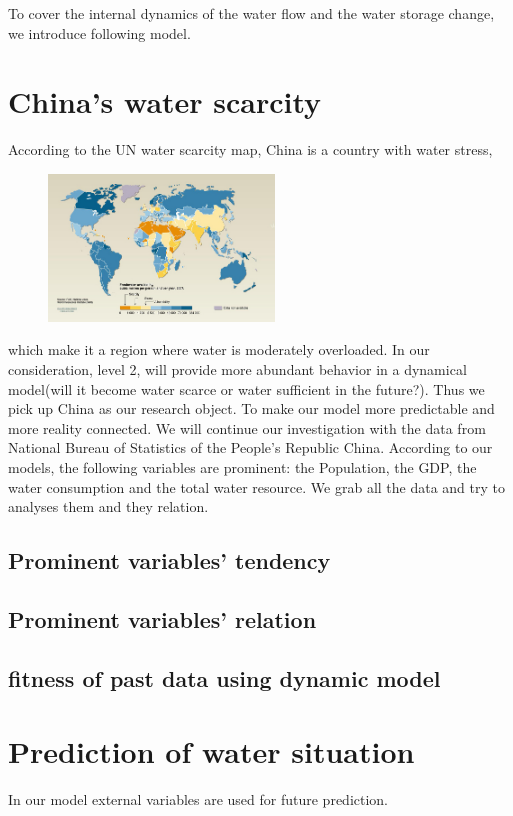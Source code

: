 To cover the internal dynamics of the water flow and the water storage change, we introduce following model.



\section{China's water scarcity}
  According to the UN water scarcity map, China is a country with water stress,
  \begin{figure}
  \includegraphics[width = 6cm]{picture/WaterScarcityMap.jpg}
  \end{figure}
  which make it a region where water is moderately overloaded. In our consideration, level 2, will provide more abundant behavior in a dynamical model(will it become water scarce or water sufficient in the future?). Thus we pick up China as our research object. To make our model more predictable and more reality connected. We will continue our investigation with the data from National Bureau of Statistics of the People's Republic China\cite{2}.
  According to our models, the following variables are prominent: the Population, the GDP, the water consumption and the total water resource.
  We grab all the data and try to analyses them and they relation.

  \subsection{Prominent variables' tendency}

  \subsection{Prominent variables' relation}

  \subsection{fitness of past data using dynamic model}


\section{Prediction of water situation}
  In our model external variables are used for future prediction.


